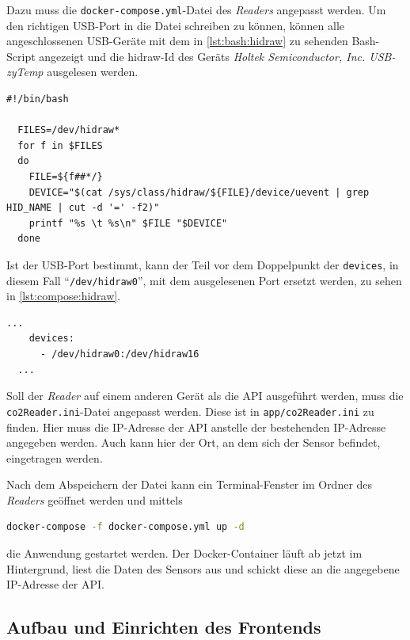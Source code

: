\documentclass[a4paper,
    12pt,
    headings=small,
    ngerman,
    listof=totoc,
    numbers=noenddot]{scrreprt}[2021/11/13]
\begin{document}
Dazu muss die \texttt{docker-compose.yml}-Datei des \textit{Readers} angepasst werden. Um den richtigen USB-Port in die Datei schreiben zu können, können alle angeschlossenen USB-Geräte mit dem in \cref{lst:bash:hidraw} zu sehenden Bash-Script angezeigt und die \gls{hidraw}-Id des Geräts \textit{Holtek Semiconductor, Inc. USB-zyTemp} ausgelesen werden. \autocite{get_usb_hidraw}

\begin{lstlisting}[language=docker-compose-2,caption={Bash-Script zum Erkennen der \gls{hidraw}-Id},breaklines=true,label={lst:bash:hidraw}]
  #!/bin/bash

  FILES=/dev/hidraw*
  for f in $FILES
  do
    FILE=${f##*/}
    DEVICE="$(cat /sys/class/hidraw/${FILE}/device/uevent | grep HID_NAME | cut -d '=' -f2)"
    printf "%s \t %s\n" $FILE "$DEVICE"
  done
\end{lstlisting}

Ist der USB-Port bestimmt, kann der Teil vor dem Doppelpunkt der \texttt{devices}, in diesem Fall \enquote{\texttt{/dev/hidraw0}}, mit dem ausgelesenen Port ersetzt werden, zu sehen in \vref{lst:compose:hidraw}.

\begin{lstlisting}[language=docker-compose-2,caption={Anpassen des USB-Ports in der docker-compose.yml},breaklines=true,label={lst:compose:hidraw}]
  ...
    devices:
      - /dev/hidraw0:/dev/hidraw16
  ...
\end{lstlisting}

Soll der \textit{Reader} auf einem anderen Gerät als die \ac{API} ausgeführt werden, muss die \texttt{co2Reader.ini}-Datei angepasst werden. Diese ist in \texttt{app/co2Reader.ini} zu finden. Hier muss die IP-Adresse der \ac{API} anstelle der bestehenden IP-Adresse angegeben werden. Auch kann hier der Ort, an dem sich der Sensor befindet, eingetragen werden.

Nach dem Abspeichern der Datei kann ein Terminal-Fenster im Ordner des \textit{Readers} geöffnet werden und mittels

\begin{lstlisting}[language=Bash]
  docker-compose -f docker-compose.yml up -d
\end{lstlisting}

die Anwendung gestartet werden. Der \gls{Docker}-Container läuft ab jetzt im Hintergrund, liest die Daten des Sensors aus und schickt diese an die angegebene IP-Adresse der \ac{API}.

\subsection{Aufbau und Einrichten des Frontends}
\end{document}
